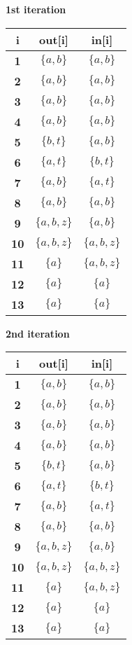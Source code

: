 \documentclass[11pt,a4paper]{article}
\begin{document}
\begin{figure}[H]
\begin{multicols}{3}
		{\bf 1st iteration} \\\vspace{0.10in}
		\begin{tabular}{|c||c|c|}
			\hline
			{\bf i}		& {\bf out[i]}		& {\bf in[i]}	\\ \hline
			{\bf 1}		& $\{a,b\}$			& $\{a,b\}$		\\ \hline
			{\bf 2}		& $\{a,b\}$			& $\{a,b\}$		\\ \hline
			{\bf 3}		& $\{a,b\}$			& $\{a,b\}$		\\ \hline	%
			{\bf 4}		& $\{a,b\}$			& $\{a,b\}$		\\ \hline
			{\bf 5}		& $\{b,t\}$			& $\{a,b\}$		\\ \hline	%
			{\bf 6}		& $\{a,t\}$			& $\{b,t\}$		\\ \hline	%
			{\bf 7}		& $\{a,b\}$			& $\{a,t\}$		\\ \hline	%
			{\bf 8}		& $\{a,b\}$			& $\{a,b\}$		\\ \hline
			{\bf 9}		& $\{a,b,z\}$		& $\{a,b\}$		\\ \hline	%
			{\bf 10}	& $\{a,b,z\}$		& $\{a,b,z\}$	\\ \hline
			{\bf 11}	& $\{a\}$			& $\{a,b,z\}$	\\ \hline	%
			{\bf 12}	& $\{a\}$			& $\{a\}$		\\ \hline
			{\bf 13}	& $\{a\}$			& $\{a\}$		\\ \hline
		\end{tabular}

		\vfill
		\columnbreak

		{\bf 2nd iteration} \\\vspace{0.10in}
		\begin{tabular}{|c||c|c|}
			\hline
			{\bf i}		& {\bf out[i]}		& {\bf in[i]}	\\ \hline
			{\bf 1}		& $\{a,b\}$			& $\{a,b\}$		\\ \hline
			{\bf 2}		& $\{a,b\}$			& $\{a,b\}$		\\ \hline
			{\bf 3}		& $\{a,b\}$			& $\{a,b\}$		\\ \hline	%
			{\bf 4}		& $\{a,b\}$			& $\{a,b\}$		\\ \hline
			{\bf 5}		& $\{b,t\}$			& $\{a,b\}$		\\ \hline	%
			{\bf 6}		& $\{a,t\}$			& $\{b,t\}$		\\ \hline	%
			{\bf 7}		& $\{a,b\}$			& $\{a,t\}$		\\ \hline	%
			{\bf 8}		& $\{a,b\}$			& $\{a,b\}$		\\ \hline
			{\bf 9}		& $\{a,b,z\}$		& $\{a,b\}$		\\ \hline	%
			{\bf 10}	& $\{a,b,z\}$		& $\{a,b,z\}$	\\ \hline
			{\bf 11}	& $\{a\}$			& $\{a,b,z\}$	\\ \hline	%
			{\bf 12}	& $\{a\}$			& $\{a\}$		\\ \hline
			{\bf 13}	& $\{a\}$			& $\{a\}$		\\ \hline
		\end{tabular}


\end{multicols}
\end{figure}
\end{document}
